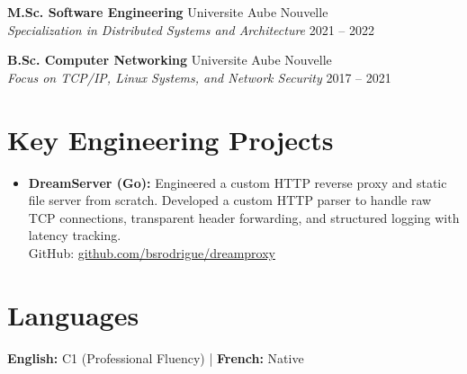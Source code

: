 \documentclass[a4paper,10pt]{article}
\begin{document}
\textbf{M.Sc. Software Engineering} \hfill Universite Aube Nouvelle \\
\textit{Specialization in Distributed Systems and Architecture} \hfill 2021 -- 2022

\vspace{0.2cm}

\textbf{B.Sc. Computer Networking} \hfill Universite Aube Nouvelle \\
\textit{Focus on TCP/IP, Linux Systems, and Network Security} \hfill 2017 -- 2021

\section*{Key Engineering Projects}
\begin{itemize}[leftmargin=*,nosep]
    \item \textbf{DreamServer (Go):} Engineered a custom HTTP reverse proxy and static file server from scratch. Developed a custom HTTP parser to handle raw TCP connections, transparent header forwarding, and structured logging with latency tracking. \\
    GitHub: \href{https://github.com/bsrodrigue/dreamproxy}{github.com/bsrodrigue/dreamproxy}
\end{itemize}

\vspace{0.1cm}

\section*{Languages}
\textbf{English:} C1 (Professional Fluency) | \textbf{French:} Native
\end{document}
